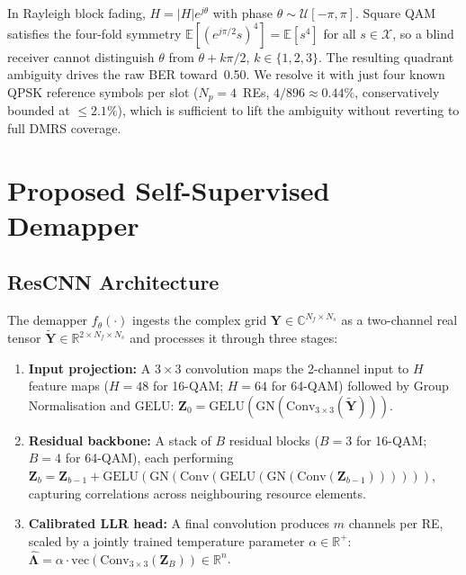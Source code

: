 \documentclass{ieeeaccess}
\begin{document}
In Rayleigh block fading, $H=|H|e^{j\theta}$ with phase $\theta\sim\mathcal{U}[-\pi,\pi]$.
Square QAM satisfies the four-fold symmetry $\mathbb{E}[(e^{j\pi/2}s)^4]=\mathbb{E}[s^4]$
for all $s\in\mathcal{X}$, so a blind receiver cannot distinguish $\theta$ from
$\theta+k\pi/2$, $k\in\{1,2,3\}$. The resulting quadrant ambiguity drives the raw BER
toward~0.50. We resolve it with just four known QPSK reference symbols per slot
($N_p=4$~REs, $4/896\approx0.44\%$, conservatively bounded at $\le2.1\%$), which is
sufficient to lift the ambiguity without reverting to full DMRS coverage.

\section{Proposed Self-Supervised Demapper}\label{sec:proposed}

\subsection{ResCNN Architecture}

The demapper $f_{\theta}(\cdot)$ ingests the complex grid
$\mathbf{Y}\in\mathbb{C}^{N_f\times N_s}$ as a two-channel real tensor
$\tilde{\mathbf{Y}}\in\mathbb{R}^{2\times N_f\times N_s}$ and processes it through
three stages:
\begin{enumerate}
  \item \textbf{Input projection:} A $3\!\times\!3$ convolution maps the 2-channel input
    to $H$ feature maps ($H\!=\!48$ for 16-QAM; $H\!=\!64$ for 64-QAM) followed by
    Group Normalisation and GELU:
    $\mathbf{Z}_0 = \mathrm{GELU}(\mathrm{GN}(\mathrm{Conv}_{3\times3}(\tilde{\mathbf{Y}})))$.
  \item \textbf{Residual backbone:} A stack of $B$ residual blocks ($B\!=\!3$ for
    16-QAM; $B\!=\!4$ for 64-QAM), each performing
    $\mathbf{Z}_b = \mathbf{Z}_{b-1}
      + \mathrm{GELU}(\mathrm{GN}(\mathrm{Conv}(\mathrm{GELU}(\mathrm{GN}(\mathrm{Conv}(\mathbf{Z}_{b-1}))))))$,
    capturing correlations across neighbouring resource elements.
  \item \textbf{Calibrated LLR head:} A final convolution produces $m$ channels per RE,
    scaled by a jointly trained temperature parameter $\alpha\in\mathbb{R}^+$:
    $\hat{\bm{\Lambda}} = \alpha\cdot\mathrm{vec}(\mathrm{Conv}_{3\times3}(\mathbf{Z}_B))\in\mathbb{R}^n$.
\end{enumerate}
\end{document}
